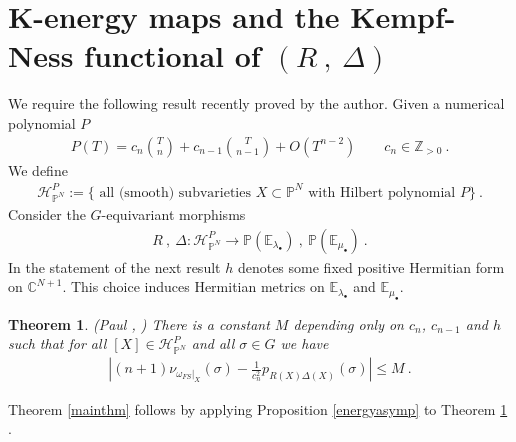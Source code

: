 \documentclass[12pt]{amsart}
\newtheorem{theorem}{Theorem}
\numberwithin{equation}{section}
\numberwithin{remark}{section}
\numberwithin{theorem}{section}
\numberwithin{proposition}{section}
\numberwithin{definition}{section}
\numberwithin{lemma}{section}
\numberwithin{claim}{section}
\numberwithin{corollary}{section}
\numberwithin{conjecture}{section}
\begin{document}
\section{K-energy maps and the Kempf-Ness functional of $(R\ ,\ \Delta)$}
 We require the following result recently proved by the author. Given a numerical polynomial $P$
 \begin{align}
 P(T)=c_n\binom{T}{n}+c_{n-1}\binom{T}{n-1}+O(T^{n-2}) \qquad c_n\in \mathbb{Z}_{>0}\  .
 \end{align}
 We define
 \begin{align}
 \mathscr{H}^P_{\ensuremath{\mathbb{P}^{N}}}:=\{\mbox{ all (smooth) subvarieties $X\subset {\ensuremath{\mathbb{P}^{N}}}$ with Hilbert polynomial $P$}\} \ .
 \end{align}
 Consider the $G$-equivariant morphisms 
 \begin{align}
 R\ , \ \Delta : \mathscr{H}^P_{\ensuremath{\mathbb{P}^{N}}}{\ensuremath{\longrightarrow}} \mathbb{P}({\ensuremath{\mathbb{E}_{\lambda_{\ensuremath{{}\bullet{}}}}}}) \ ,\ \mathbb{P}({\ensuremath{\mathbb{E}_{\mu_{\ensuremath{{}\bullet{}}}}}}) \ .
 \end{align}
In the statement of the next result $h$ denotes some fixed positive Hermitian form on ${\ensuremath{\mathbb{C}^{N+1}}}$. This choice induces Hermitian metrics on ${\ensuremath{\mathbb{E}_{\lambda_{\ensuremath{{}\bullet{}}}}}}$ and ${\ensuremath{\mathbb{E}_{\mu_{\ensuremath{{}\bullet{}}}}}}$. 
\begin{theorem}\label{core} (Paul \cite{paul2011}, \cite{paulcm2012}) 
\emph{ There is a constant $M$ depending only on $c_n$, $c_{n-1}$ and $h$ such that for all $[X]\in \mathscr{H}^P_{\ensuremath{\mathbb{P}^{N}}}$ and all $\sigma\in G$ we have}
 \begin{align}
   |(n+1) \nu_{{{\ensuremath{\omega}}_{FS}}|_{X}}(\sigma)- \frac{1}{c_n^2}
  p_{R(X)\Delta(X)}(\sigma) | \leq M \ .  
 \end{align}
 \end{theorem}
 Theorem \ref{mainthm} follows by applying Proposition \ref{energyasymp} to Theorem \ref{core} .
 
\end{document}
